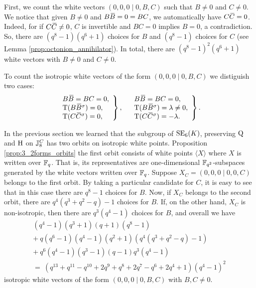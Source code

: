First, we count the white vectors $(0,0,0\mid 0,B,C)$ such that $B \neq 0$ and $C \neq 0$.
We notice that given $B \neq 0$ and $B\mathord{\mbox{\hspace*{0pt}}\,\overline{\!B\!\!\;}\!\:}\mbox{\hspace*{0pt}} = 0 = BC$, we automatically have $C\mathord{\mbox{\hspace*{0pt}}\,\overline{\!C\!\!\;}\!\:}\mbox{\hspace*{0pt}} = 0$. 
Indeed, for if $C\mathord{\mbox{\hspace*{0pt}}\,\overline{\!C\!\!\;}\!\:}\mbox{\hspace*{0pt}} \neq 0$, $C$ is invertible and $BC = 0$ implies $B = 0$, a contradiction.
So, there are $(q^8-1)(q^6+1)$ choices for $B$ and $(q^8-1)$ choices for $C$ 
(see Lemma \ref{prop:octonion_annihilator}). In total, there are $(q^8-1)^2 (q^6+1)$ white
vectors with $B \neq 0$ and $C \neq 0$. 

To count the isotropic white vectors of the form $(0,0,0\mid 0,B,C)$ we distiguish two cases:
\begin{equation}
	\label{eq:8twocases}
	\left.
		\begin{array}{l}
			B\ovB = BC = 0,\\
			\Tr(B\ovB^{\s}) = 0,\\
			\Tr(C\ovC^{\s}) = 0,\\
		\end{array}
	\right\},\quad
	\left.
		\begin{array}{l}
			B\ovB = BC = 0,\\
			\Tr(B\ovB^{\s}) = \lambda \neq 0,\\
			\Tr(C\ovC^{\s}) = -\lambda.\\
		\end{array}
	\right\}.
\end{equation}

In the previous section we learned that the subgroup of $\mathrm{SE}_6(K)$, preserving $\mathord{\mathrm{Q}}$ and $\mathrm{H}$
on $\mathbb{J}_8^C$ has two orbits on isotropic white points. Proposition \ref{prop:3_2forms_orbits}
the first orbit consists of white points
$\langle X \rangle$ where $X$ is written over $\mathbb{F}_q$. That is, its representatives are
one-dimensional $\mathbb{F}_{q^2}$-subspaces generated by the white vectors written over $\mathbb{F}_q$.
Suppose $X_C = (0,0,0\mid 0,0,C)$ belongs to the first orbit. By taking a particular candidate 
for $C$, it is easy to see that in this case there are $q^8-1$ choices for $B$.
Now, if $X_C$ belongs to the second orbit, there are $q^4(q^3+q^2-q)-1$ choices for $B$.
If, on the other hand, $X_C$ is non-isotropic, then there are $q^3(q^4-1)$ choices for $B$, and overall
we have 
\begin{multline}
	(q^4-1)(q^3+1)(q+1)(q^8-1) \\
	+\ q(q^6-1)(q^4-1)(q^2+1)(q^4(q^3+q^2-q)-1) \\
	+\ q^6(q^4-1)(q^3-1)(q-1)q^3(q^4-1) \\
	=\ (q^{13}+q^{11}-q^{10}+2q^9+q^8+2q^7-q^6+2q^4+1)(q^4-1)^2
\end{multline}
isotropic white vectors of the form $(0,0,0\mid 0,B,C)$ with $B,C \neq 0$. 

